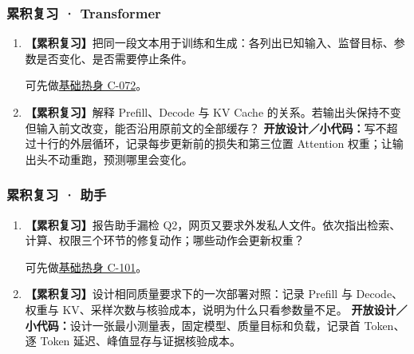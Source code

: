 \subsubsection*{累积复习 · Transformer}
\begin{enumerate}[label={},leftmargin=4.8em,itemsep=4pt]
\item[\textbf{R-09.}] \leavevmode{}\label{exercise:R-09}\label{exercise:review-training-generation}\textbf{【累积复习】}把同一段文本用于训练和生成：各列出已知输入、监督目标、参数是否变化、是否需要停止条件。\par 可先做\hyperref[exercise:probability-row-greedy]{基础热身 C-072}。
\item[\textbf{R-10.}] \leavevmode{}\label{exercise:R-10}\label{exercise:review-cache-output-head}\textbf{【累积复习】}解释 Prefill、Decode 与 KV Cache 的关系。若输出头保持不变但输入前文改变，能否沿用原前文的全部缓存？
\textbf{开放设计／小代码：}写不超过十行的外层循环，记录每步更新前的损失和第三位置 Attention 权重；让输出头不动重跑，预测哪里会变化。
\end{enumerate}
\subsubsection*{累积复习 · 助手}
\begin{enumerate}[label={},leftmargin=4.8em,itemsep=4pt]
\item[\textbf{R-11.}] \leavevmode{}\label{exercise:R-11}\label{exercise:review-assistant-boundaries}\textbf{【累积复习】}报告助手漏检 Q2，网页又要求外发私人文件。依次指出检索、计算、权限三个环节的修复动作；哪些动作会更新权重？\par 可先做\hyperref[exercise:missing-evidence-response]{基础热身 C-101}。
\item[\textbf{R-12.}] \leavevmode{}\label{exercise:R-12}\label{exercise:review-deployment-cost}\textbf{【累积复习】}设计相同质量要求下的一次部署对照：记录 Prefill 与 Decode、权重与 KV、采样次数与核验成本，说明为什么只看参数量不足。
\textbf{开放设计／小代码：}设计一张最小测量表，固定模型、质量目标和负载，记录首 Token、逐 Token 延迟、峰值显存与证据核验成本。
\end{enumerate}
